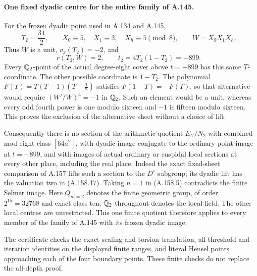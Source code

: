 \paragraph{One fixed dyadic centre for the entire family of A.145.}
For the frozen dyadic point used in A.134 and A.145,
\[
 T_2=\frac{31}{2},\qquad
 X_0\equiv5,\quad X_1\equiv3,\quad X_h\equiv5\pmod8,
 \qquad W=X_0X_1X_h.
\tag{A.158.16}
\]
Thus \(W\) is a unit, \(v_\pi(T_2)=-2\), and
\[
                 r(T_2,W)=2,\qquad
                       t_2=4T_2(1-T_2)=-899.
\tag{A.158.17}
\]
Every \(\mathbb Q_2\)-point of the actual degree-eight cover
above \(t=-899\) has this same \(T\)-coordinate.
The other possible coordinate is \(1-T_2\).
The polynomial \(F(T)=T(T-1)(T-\tfrac12)\) satisfies
\(F(1-T)=-F(T)\), so that alternative would require
\((W'/W)^4=-1\) in \(\mathbb Q_2\).
Such an element would be a unit, whereas every odd
fourth power is one modulo sixteen and \(-1\) is
fifteen modulo sixteen.  This proves the exclusion
of the alternative sheet without a choice of lift.

Consequently there is no section of the arithmetic
quotient \(E_U/N_2\) with combined mod-eight class
\([64a^2]\), with dyadic image conjugate to the ordinary
point image at \(t=-899\), and with images of actual
ordinary or cuspidal local sections at every other
place, including the real place.  Indeed the exact
fixed-sheet comparison of A.157 lifts such a section
to the \(D^\circ\) subgroup; its dyadic lift has the
valuation two in (A.158.17).  Taking \(n=1\) in
(A.158.5) contradicts the finite Selmer image.
Here \(Q_{m=2}\) denotes the finite geometric group,
of order \(2^{15}=32768\) and exact class ten;
\(\mathbb Q_2\) throughout denotes the local field.
The other local centres are unrestricted.  This one
finite quotient therefore applies to every member
of the family of A.145 with its frozen dyadic image.

The certificate
checks the exact scaling and torsion translation, all threshold
and iteration identities on the displayed finite ranges, and
literal Hensel points approaching each of the four boundary
points.  These finite checks do not replace the all-depth proof.
